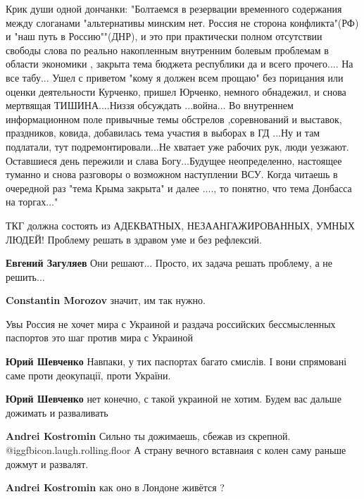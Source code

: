 \begin{itemize}
Крик души одной дончанки: "Болтаемся в резервации временного содержания между
слоганами "альтернативы минским нет. Россия не сторона конфликта"(РФ) и "наш
путь в Россию""(ДНР), и это при практически полном отсутствии свободы слова по
реально накопленным внутренним болевым проблемам в области экономики , закрыта
тема бюджета республики да и всего прочего.... На все табу... Ушел с приветом
"кому я должен всем прощаю" без порицания или оценки деятельности Курченко,
пришел Юрченко, немного обнадежил, и снова мертвящая ТИШИНА....Низзя обсуждать
...война... Во внутреннем информационном поле привычные темы обстрелов
,соревнований и выставок, праздников, ковида, добавилась тема участия в выборах
в ГД ...Ну и там подлатали, тут подремонтировали...Не хватает уже рабочих рук,
люди уезжают. Оставшиеся день пережили и слава Богу...Будущее неопределенно,
настоящее туманно и снова разговоры о возможном наступлении ВСУ. Когда читаешь
в очередной раз "тема Крыма закрыта" и далее ...., то понятно, что тема
Донбасса на торгах..."


ТКГ должна состоять из АДЕКВАТНЫХ, НЕЗААНГАЖИРОВАННЫХ, УМНЫХ ЛЮДЕЙ! Проблему
решать в здравом уме и без рефлексий.

\begin{itemize} %
\textbf{Евгений Загуляев} Они решают... Просто, их задача решать проблему, а не решить...

\textbf{Constantin Morozov} значит, им так нужно.
\end{itemize} %

Увы Россия не хочет мира с Украиной и раздача российских бессмысленных
паспортов это шаг против мира с Украиной

\begin{itemize} %
\textbf{Юрий Шевченко} Навпаки, у тих паспортах багато смислів. І вони спрямовані саме проти деокупації, проти України.

\textbf{Юрий Шевченко} нет конечно, с такой украиной не хотим. Будем вас дальше дожимать и разваливать

\textbf{Andrei Kostromin} Сильно ты дожимаешь, сбежав из скрепной.  @igg{fbicon.laugh.rolling.floor} 
А страну вечного вставнаия с колен саму раньше дожмут и развалят.

\textbf{Andrei Kostromin} как оно в Лондоне живётся ?


\end{itemize}
\end{itemize}
